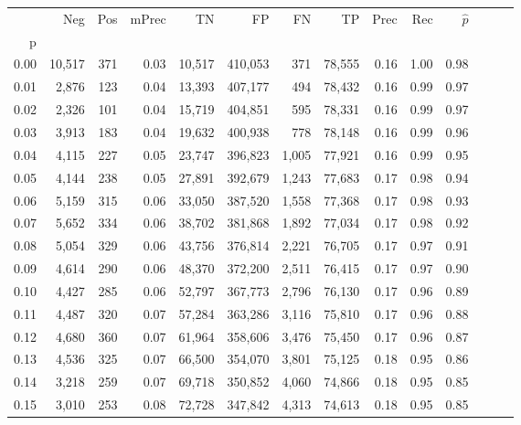 \begin{tabular}{rrrrrrrrrrrrrr}
\toprule
{} &     Neg &    Pos & mPrec &       TN &       FP &      FN &      TP &  Prec &   Rec & $\hat{p}$ \\
p    &         &        &       &          &          &         &         &       &       &           \\
\midrule
0.00 &  10,517 &    371 &  0.03 &   10,517 &  410,053 &     371 &  78,555 &  0.16 &  1.00 &      0.98 \\
0.01 &   2,876 &    123 &  0.04 &   13,393 &  407,177 &     494 &  78,432 &  0.16 &  0.99 &      0.97 \\
0.02 &   2,326 &    101 &  0.04 &   15,719 &  404,851 &     595 &  78,331 &  0.16 &  0.99 &      0.97 \\
0.03 &   3,913 &    183 &  0.04 &   19,632 &  400,938 &     778 &  78,148 &  0.16 &  0.99 &      0.96 \\
0.04 &   4,115 &    227 &  0.05 &   23,747 &  396,823 &   1,005 &  77,921 &  0.16 &  0.99 &      0.95 \\
0.05 &   4,144 &    238 &  0.05 &   27,891 &  392,679 &   1,243 &  77,683 &  0.17 &  0.98 &      0.94 \\
0.06 &   5,159 &    315 &  0.06 &   33,050 &  387,520 &   1,558 &  77,368 &  0.17 &  0.98 &      0.93 \\
0.07 &   5,652 &    334 &  0.06 &   38,702 &  381,868 &   1,892 &  77,034 &  0.17 &  0.98 &      0.92 \\
0.08 &   5,054 &    329 &  0.06 &   43,756 &  376,814 &   2,221 &  76,705 &  0.17 &  0.97 &      0.91 \\
0.09 &   4,614 &    290 &  0.06 &   48,370 &  372,200 &   2,511 &  76,415 &  0.17 &  0.97 &      0.90 \\
0.10 &   4,427 &    285 &  0.06 &   52,797 &  367,773 &   2,796 &  76,130 &  0.17 &  0.96 &      0.89 \\
0.11 &   4,487 &    320 &  0.07 &   57,284 &  363,286 &   3,116 &  75,810 &  0.17 &  0.96 &      0.88 \\
0.12 &   4,680 &    360 &  0.07 &   61,964 &  358,606 &   3,476 &  75,450 &  0.17 &  0.96 &      0.87 \\
0.13 &   4,536 &    325 &  0.07 &   66,500 &  354,070 &   3,801 &  75,125 &  0.18 &  0.95 &      0.86 \\
0.14 &   3,218 &    259 &  0.07 &   69,718 &  350,852 &   4,060 &  74,866 &  0.18 &  0.95 &      0.85 \\
0.15 &   3,010 &    253 &  0.08 &   72,728 &  347,842 &   4,313 &  74,613 &  0.18 &  0.95 &      0.85 \\

\end{tabular}
